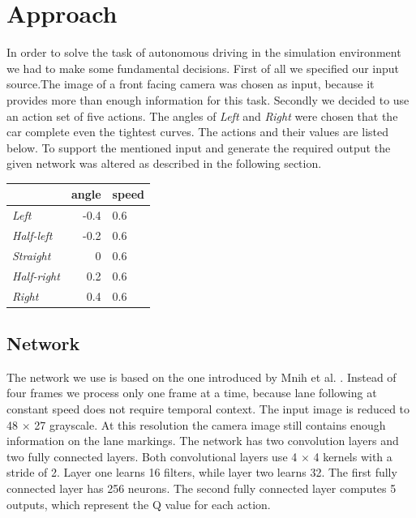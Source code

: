 
\section{Approach}\label{sec:approach}

In order to solve the task of autonomous driving in the simulation environment we had to make some fundamental decisions. First of all we specified our input source.The image of a front facing camera was chosen as input, because it provides more than enough information for this task. Secondly we decided to use an action set of five actions. The angles of \textit{Left} and \textit{Right} were chosen that the car complete even the tightest curves. The actions and their values are listed below. To support the mentioned input and generate the required output the given network was altered as described in the following section.
\begin{center}
	\begin{tabular}{ l | r | l }
							&	angle	& speed\\
		\hline
		\textit{Left} 		& 	-0.4 	& 0.6	\\
		\textit{Half-left} 	& 	-0.2 	& 0.6	\\
		\textit{Straight} 	& 	0 		& 0.6	\\
		\textit{Half-right} & 	0.2 	& 0.6	\\
		\textit{Right} 		& 	0.4 	& 0.6	\\
	\end{tabular}
	\label{actionset}
\end{center}

\subsection{Network}
The network we use is based on the one introduced by Mnih et al. \cite{Mnih13}. Instead of four frames we process only one frame at a time, because lane following at constant speed does not require temporal context. The input image is reduced to 48 $\times$ 27 grayscale. At this resolution the camera image still contains enough information on the lane markings. The network has two convolution layers and two fully connected layers. Both convolutional layers use 4 $\times$ 4 kernels with a stride of 2. Layer one learns 16 filters, while layer two learns 32. The first fully connected layer has 256 neurons. The second fully connected layer computes 5 outputs, which represent the Q value for each action.

